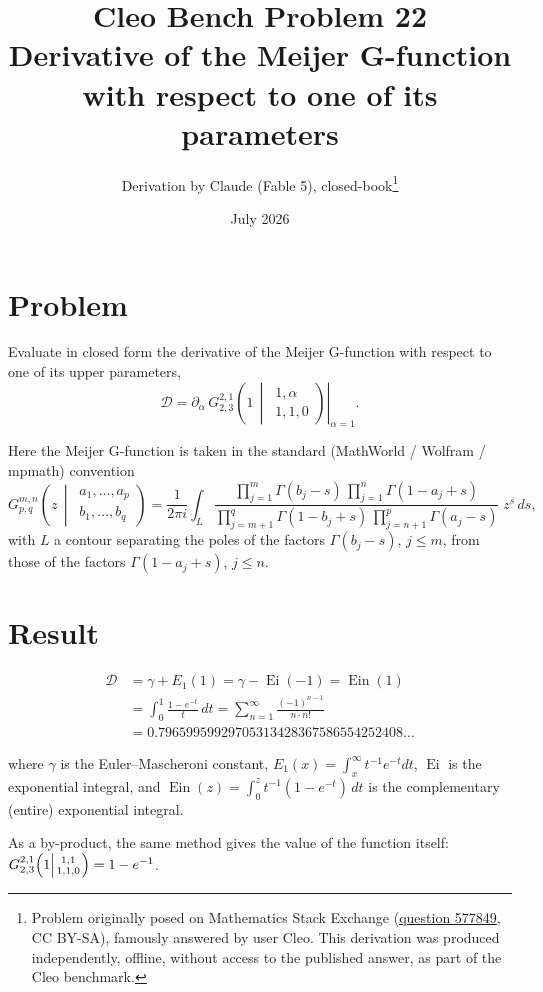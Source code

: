 \documentclass[11pt]{article}
\title{Cleo Bench Problem 22\\[1ex]\large Derivative of the Meijer G-function with respect to one of its parameters}
\author{Derivation by Claude (Fable 5), closed-book\thanks{Problem originally
posed on Mathematics Stack Exchange
(\href{https://math.stackexchange.com/q/577849}{question 577849}, CC BY-SA),
famously answered by user Cleo. This derivation was produced independently,
offline, without access to the published answer, as part of the Cleo benchmark.}}
\date{July 2026}
\theoremstyle{remark}
\begin{document}
\maketitle

\section*{Problem}

Evaluate in closed form the derivative of the Meijer G-function with respect to one of its upper parameters,
\[
\mathcal{D}=\left.\partial_\alpha\, G_{2,3}^{2,1}\!\left(1\,\middle|\,\begin{array}{c}1,\alpha\\1,1,0\end{array}\right)\right|_{\alpha=1}.
\]

Here the Meijer G-function is taken in the standard (MathWorld / Wolfram / mpmath) convention
\[
G_{p,q}^{m,n}\!\left(z\,\middle|\,\begin{array}{c}a_1,\dots,a_p\\ b_1,\dots,b_q\end{array}\right)
=\frac{1}{2\pi i}\int_{L}
\frac{\prod_{j=1}^{m}\Gamma(b_j-s)\,\prod_{j=1}^{n}\Gamma(1-a_j+s)}
{\prod_{j=m+1}^{q}\Gamma(1-b_j+s)\,\prod_{j=n+1}^{p}\Gamma(a_j-s)}\;z^{s}\,ds ,
\]
with $L$ a contour separating the poles of the factors $\Gamma(b_j-s)$, $j\le m$, from those of the factors $\Gamma(1-a_j+s)$, $j\le n$.

\section*{Result}

\[
\boxed{\;
\begin{aligned}
\mathcal{D}
&=\gamma+E_1(1)
=\gamma-\operatorname{Ei}(-1)
=\operatorname{Ein}(1)\\
&=\int_0^1\frac{1-e^{-t}}{t}\,dt
=\sum_{n=1}^{\infty}\frac{(-1)^{n-1}}{n\cdot n!}\\
&= 0.79659959929705313428367586554252408\ldots
\end{aligned}
\;}
\]

where $\gamma$ is the Euler--Mascheroni constant, $E_1(x)=\int_x^\infty t^{-1}e^{-t}dt$, $\operatorname{Ei}$ is the exponential integral, and $\operatorname{Ein}(z)=\int_0^z t^{-1}(1-e^{-t})\,dt$ is the complementary (entire) exponential integral.

As a by-product, the same method gives the value of the function itself:
$G_{2,3}^{2,1}\!\left(1\middle|{1,1\atop 1,1,0}\right)=1-e^{-1}$.
\end{document}

